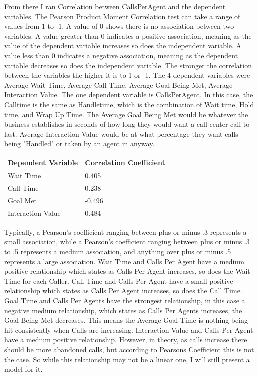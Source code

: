 \documentclass[12pt]{article}
\begin{document}
  From there I ran Correlation between CallsPerAgent and the dependent variables. The Pearson Product Moment Correlation test can take a range of values from 1 to -1. A value of 0 shows there is no association between two variables. 
A value greater than 0 indicates a positive association, meaning as the value of the dependent variable increases so does the independent variable. A value less than 0 indicates a negative association, meaning as the dependent 
variable decreases so does the independent variable. The stronger the correlation between the variables the higher it is to 1 or -1.  The 4 dependent variables were Average Wait Time, Average Call Time, Average Goal Being Met, Average Interaction Value. 
The one dependent variable is CallsPerAgent. In this case, the Calltime is the same as Handletime, which is the combination of Wait time, Hold time, and Wrap Up Time. 
The Average Goal Being Met would be whatever the business establishes in seconds of  how long they would want a call center call to last. Average Interaction Value would be at what percentage 
they want calls being "Handled" or taken by an agent in anyway. 
\begin{table}[H]
  \resizebox{\textwidth}{!} {
  \begin{tabular}{ l | l |}
    {\bf Dependent Variable} & {\bf Correlation Coefficient}\\
  \hline
  Wait Time& 0.405 \\
  \hline
  Call Time& 0.238\\
  \hline
  Goal Met& -0.496  \\
  \hline
  Interaction Value& 0.484\\
  \end{tabular}
  }
  \end{table}
Typically, a Pearson's coefficient ranging between plus or minus .3 represents a small association, while a Pearson's coefficient
ranging between plus or minus .3 to .5 represents a medium association, and anything over plus or minus .5 represents a large association.
Wait Time and Calls Per Agent have a medium positive relationship which states as Calls Per Agent increases, so does the Wait Time for 
each Caller. Call Time and Calls Per Agent have a small positive relationship which states as Calls Per Agent increases, so does the 
Call Time. Goal Time and Calls Per Agents have the strongest relationship, in this case a negative medium relationship, which states as
Calls Per Agents increases, the Goal Being Met decreases. This means the Average Goal Time is nothing being hit consistently when Calls 
are increasing. Interaction Value and Calls Per Agent have a medium positive relationship. However, in theory, as calls increase there should
be more abandoned calls, but according to Pearsons Coefficient this is not the case. So while this relationship may not be a linear one,
I will still present a model for it.
  
\end{document}
